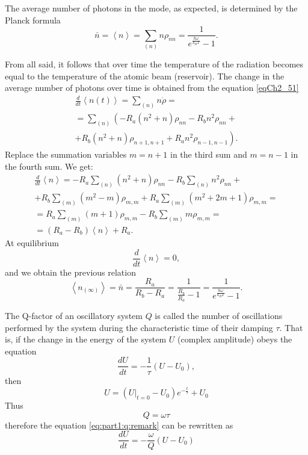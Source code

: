 The average number of photons in the mode, as expected, is determined by the Planck formula
\begin{equation}
\bar{n} = \left<n\right> = 
\sum_{(n)} n \rho_{nn} = 
\frac{1}{ e^{\frac{\hbar \omega}{k_B T}} - 1}.
\end{equation}

From all said, it follows that over time the temperature of the radiation becomes equal to the temperature of the atomic beam (reservoir).  
The change in the average number of photons over time is obtained from the equation \eqref{eqCh2_51}
\begin{eqnarray}
\frac{d}{d t}\left<n\left(t\right)\right> = \sum_{(n)}n \dot{\rho} = 
\nonumber \\
= \sum_{(n)}\left(-R_a\left(n^2 + n\right)\rho_{nn} - R_b n^2
\rho_{nn} + \right.
\nonumber \\
+ \left.
R_b \left(n^2 + n\right) \rho_{n +1, n+ 1} +
R_a n^2 \rho_{n - 1, n - 1}
\right).
\end{eqnarray}
Replace the summation variables $m= n + 1$ in the third sum and $m = n - 1$ in the fourth sum. We get:
\begin{eqnarray}
\frac{d}{d t}\left<n\right> = 
-R_a \sum_{(n)}\left(n^2 + n\right)\rho_{nn}
 - R_b \sum_{(n)} n^2 \rho_{nn} +
\nonumber \\
+ R_b\sum_{(m)}\left(m^2 - m\right)\rho_{m,m} 
+ R_a\sum_{(m)}\left(m^2 +2 m + 1\right)\rho_{m,m} = 
\nonumber \\
= R_a \sum_{(m)}\left( m + 1\right)\rho_{m,m} - R_b\sum_{(m)} m
\rho_{m,m} =
\nonumber \\
= \left(R_a - R_b\right) \left<n\right> + R_a.
\label{eqCh2_57}
\end{eqnarray}
At equilibrium
\[
\frac{d}{d t}\left<n\right> = 0,
\]  
and we obtain the previous relation
\begin{equation}
\left<n_{(\infty)}\right> = \bar{n} = 
\frac{R_a}{R_b - R_a} = \frac{1}{\frac{R_b}{R_a} - 1} = 
\frac{1}{e^{\frac{\hbar \omega}{k_B T}} - 1}.
\end{equation}

\begin{definition}[Q-factor]
\label{def:Qfactor}
The Q-factor of an oscillatory system $Q$ is called \cite{bKarlov2003} the number of oscillations performed by the system during the characteristic time of their damping $\tau$. That is, if the change in the energy of the system $U$ (complex amplitude) obeys the equation
\begin{equation}
\label{eq:part1:q:remark}
\frac{d U}{d t} = - \frac{1}{\tau} \left(U - U_0\right),
\end{equation}
then
\[
U = \left(\left.U\right|_{t=0} - U_0 \right)e^{-\frac{t}{\tau}} + U_0
\]
Thus
\[
Q = \omega \tau
\]
therefore the equation \eqref{eq:part1:q:remark} can be rewritten as 
\[
\frac{d U}{d t} = - \frac{\omega}{Q} \left(U-U_0\right)
\]
\end{definition}


